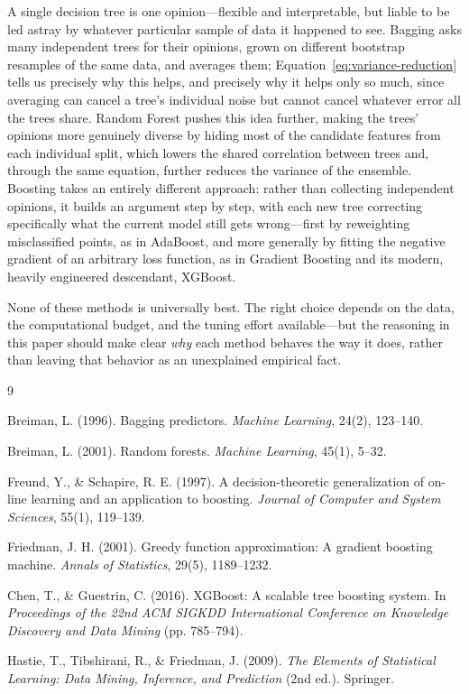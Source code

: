\documentclass[12pt,a4paper]{article}
\begin{document}
A single decision tree is one opinion---flexible and interpretable, but liable to be led astray by whatever particular sample of data it happened to see. Bagging asks many independent trees for their opinions, grown on different bootstrap resamples of the same data, and averages them; Equation~\eqref{eq:variance-reduction} tells us precisely why this helps, and precisely why it helps only so much, since averaging can cancel a tree's individual noise but cannot cancel whatever error all the trees share. Random Forest pushes this idea further, making the trees' opinions more genuinely diverse by hiding most of the candidate features from each individual split, which lowers the shared correlation between trees and, through the same equation, further reduces the variance of the ensemble. Boosting takes an entirely different approach: rather than collecting independent opinions, it builds an argument step by step, with each new tree correcting specifically what the current model still gets wrong---first by reweighting misclassified points, as in AdaBoost, and more generally by fitting the negative gradient of an arbitrary loss function, as in Gradient Boosting and its modern, heavily engineered descendant, XGBoost.

None of these methods is universally best. The right choice depends on the data, the computational budget, and the tuning effort available---but the reasoning in this paper should make clear \emph{why} each method behaves the way it does, rather than leaving that behavior as an unexplained empirical fact.


\begin{thebibliography}{9}

Breiman, L. (1996).
\newblock Bagging predictors.
\newblock \emph{Machine Learning}, 24(2), 123--140.

Breiman, L. (2001).
\newblock Random forests.
\newblock \emph{Machine Learning}, 45(1), 5--32.

Freund, Y., \& Schapire, R. E. (1997).
\newblock A decision-theoretic generalization of on-line learning and an application to boosting.
\newblock \emph{Journal of Computer and System Sciences}, 55(1), 119--139.

Friedman, J. H. (2001).
\newblock Greedy function approximation: A gradient boosting machine.
\newblock \emph{Annals of Statistics}, 29(5), 1189--1232.

Chen, T., \& Guestrin, C. (2016).
\newblock XGBoost: A scalable tree boosting system.
\newblock In \emph{Proceedings of the 22nd ACM SIGKDD International Conference on Knowledge Discovery and Data Mining} (pp. 785--794).

Hastie, T., Tibshirani, R., \& Friedman, J. (2009).
\newblock \emph{The Elements of Statistical Learning: Data Mining, Inference, and Prediction} (2nd ed.).
\newblock Springer.

\end{thebibliography}
\end{document}

